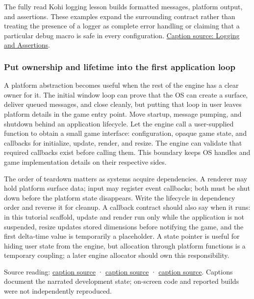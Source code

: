 The fully read Kohi logging lesson builds formatted messages, platform output, and assertions. These examples expand the surrounding contract rather than treating the presence of a logger as complete error handling or claiming that a particular debug macro is safe in every configuration. \href{https://www.youtube.com/watch?v=l9e8PJskYnI}{Caption source: Logging and Assertions}.

\subsubsection{Put ownership and lifetime into the first application loop}\label{05-engine-i-ch013-put-ownership-and-lifetime-into-the-first-application-loop}

\hypertarget{05-engine-i-ch013-put-ownership-and-lifetime-into-the-first-application-loop}{}

A platform abstraction becomes useful when the rest of the engine has a clear owner for it. The initial window loop can prove that the OS can create a surface, deliver queued messages, and close cleanly, but putting that loop in user  leaves platform details in the game entry point. Move startup, message pumping, and shutdown behind an application lifecycle. Let the engine call a user-supplied  function to obtain a small game interface: configuration, opaque game state, and callbacks for initialize, update, render, and resize. The engine can validate that required callbacks exist before calling them. This boundary keeps OS handles and game implementation details on their respective sides.

The order of teardown matters as systems acquire dependencies. A renderer may hold platform surface data; input may register event callbacks; both must be shut down before the platform state disappears. Write the lifecycle in dependency order and reverse it for cleanup. A callback contract should also say when it runs: in this tutorial scaffold, update and render run only while the application is not suspended, resize updates stored dimensions before notifying the game, and the first delta-time value is temporarily a placeholder. A  state pointer is useful for hiding user state from the engine, but allocation through platform functions is a temporary coupling; a later engine allocator should own this responsibility.

Source reading: \href{https://www.youtube.com/watch?v=jEbqCf-MsZs}{caption source} · \href{https://www.youtube.com/watch?v=ojEPsZFPj2Q}{caption source} · \href{https://www.youtube.com/watch?v=nGgvWzoCsyk}{caption source}. Captions document the narrated development state; on-screen code and reported builds were not independently reproduced.

